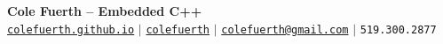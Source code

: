 \begin{center}
    \textbf{\Huge Cole Fuerth -- Embedded C++} \\ \vspace{5pt}
    \hspace{1pt} \faGlobe \hspace{2pt} \href{https://colefuerth.github.io/}{\texttt{colefuerth.github.io}} \hspace{1pt} $|$
    \hspace{1pt} \faGithub \hspace{2pt} \href{https://github.com/colefuerth}{\texttt{colefuerth}} \hspace{1pt} $|$
    \hspace{1pt} \faEnvelope \hspace{2pt} \href{mailto::colefuerth@gmail.com}{\texttt{colefuerth@gmail.com}} \hspace{1pt} $|$
    \small \faPhone* \texttt{519.300.2877}
    \\ \vspace{-3pt}
  \end{center}